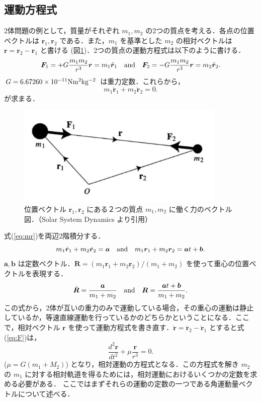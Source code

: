 \documentclass[11pt,a4paper,oneside,onecolumn]{jreport}
\begin{document}
\subsection{運動方程式 \label{sec:EoM}}
2体問題の例として，質量がそれぞれ $m_1, m_2$ の2つの質点を考える．各点の位置ベクトルは ${\bm r}_1, {\bm r}_2$ である．また，$m_1$ を基準とした $m_2$ の相対ベクトルは ${\bm r} = {\bm r}_2 - {\bm r}_1$ と書ける (図\ref{fig:2body})．2つの質点の運動方程式は以下のように書ける．
\begin{equation}
{\bm F}_1 = + G \frac{m_1 m_2}{r^3} {\bm r} = m_1 \ddot{{\bm r}}_1 \quad {\rm and} \quad {\bm F}_2 = - G \frac{m_1 m_2}{r^3} {\bm r} = m_2 \ddot{{\bm r}}_2. \label{eq:F}
\end{equation}
$G = 6.67260 \times 10^{-11} {\rm N m^2 kg^{-2}}$ は重力定数．これらから，
\begin{equation}
m_1 \ddot{{\bm r}}_1 + m_2 \ddot{{\bm r}}_2 = 0. \label{eq:mr}
\end{equation}
が求まる．

\begin{figure}[H]
\centering
\includegraphics[width=10cm]{./image/sec2_1.pdf}
\caption{位置ベクトル ${\bm r}_1, {\bm r}_2$ にある２つの質点 $m_1, m_2$ に働く力のベクトル図．（Solar System Dynamics\cite{SSD} より引用）\label{fig:2body}}
\end{figure}

式(\ref{eq:mr})を両辺2階積分する．
\begin{equation}
m_1 \dot{{\bm r}}_1 + m_2 \dot{{\bm r}}_2 = {\bm a} \quad {\rm and} \quad m_1 {\bm r}_1 + m_2 {\bm r}_2 = {\bm a} t + {\bm b}.
\end{equation}
${\bm a}, {\bm b}$ は定数ベクトル．${\bm R} = (m_1 {\bm r}_1 + m_2 {\bm r}_2)/(m_1 + m_2)$ を使って重心の位置ベクトルを表現する．
\begin{equation}
\dot{{\bm R}} = \frac{{\bm a}}{m_1 + m_2} \quad {\rm and} \quad {\bm R} = \frac{{\bm a} t + {\bm b}}{m_1 + m_2}.
\end{equation}
この式から，2体が互いの重力のみで運動している場合，その重心の運動は静止しているか，等速直線運動を行っているかのどちらかということになる．ここで，相対ベクトル ${\bm r}$ を使って運動方程式を書き直す．$\ddot{{\bm r}} = \ddot{{\bm r}}_2 - \ddot{{\bm r}}_1$ とすると式(\ref{eq:F})は，
\begin{equation}
\frac{d^2 {\bm r}}{dt^2} + \mu \frac{{\bm r}}{r^3} = 0. \label{eq:raletive}
\end{equation}
($\mu = G (m_1 + M_2)$) となり，相対運動の方程式となる．この方程式を解き $m_2$ の $m_1$ に対する相対軌道を得るためには，相対運動におけるいくつかの定数を求める必要がある． ここではまずそれらの運動の定数の一つである角運動量ベクトルについて述べる．
\end{document}
